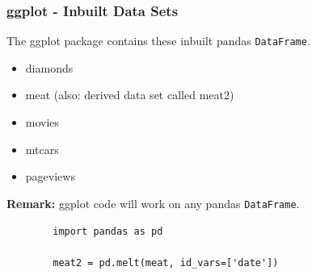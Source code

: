 \documentclass{beamer}
\begin{document}
\begin{frame}
	\frametitle{ggplot - Inbuilt Data Sets}
	\Large
	The ggplot package contains these inbuilt  pandas \texttt{DataFrame}.
	\begin{itemize}
		\item diamonds
		\item meat  (also: derived data set called meat2)
		\item movies
		\item mtcars
		\item pageviews
	\end{itemize}
	\bigskip
	\noindent \textbf{Remark:}
	ggplot code will work on any pandas \texttt{DataFrame}. 
\end{frame}
\begin{frame}[fragile]
	\Large
	\begin{framed}
		\begin{verbatim}
		import pandas as pd
		
		meat2 = pd.melt(meat, id_vars=['date'])
		\end{verbatim}
	\end{framed}
\end{frame}
\end{document}

